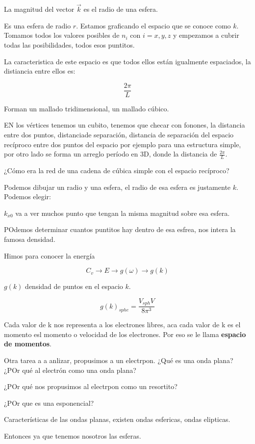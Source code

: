 \documentclass{article}
\begin{document}
La magnitud del vector $\vec{k}$ es el radio de una esfera. 


Es una esfera de radio $r$. Estamos graficando el espacio que se conoce como $k$. Tomamos todos los valores posibles de $n_{i}$ con $i=x,y,z$  y empezamos a cubrir todas las posibilidades, todos esos puntitos. 

La caracteristica de este espacio es que todos ellos están igualmente espaciados, la distiancia entre ellos es:


\[ \frac{2\pi}{L} \]


Forman un mallado tridimensional, un mallado cúbico. 

EN los vértices tenemos un cubito, tenemos que checar con fonones, la distancia entre dos puntos, distanciade separación, distancia de separación del espacio recíproco entre dos puntos del espacio por ejemplo para una estructura simple, por otro lado se forma un arreglo período en 3D, donde la distancia de $\frac{2\pi}{L}$.


¿Cómo era la red de una cadena de cúbica simple con el espacio recíproco? 

Podemos dibujar un radio y una esfera, el radio de esa esfera es justamente $k$. Podemos elegir:


$k_{x0}$ va a ver muchos punto que tengan la misma magnitud sobre esa esfera. 


POdemos determinar cuantos puntitos hay dentro de esa esfrea, nos intera la famosa densidad. 

Himos para conocer la energía

\[ C_{v} \to E \to g(\omega) \to g(k) \]

$g(k)$ densidad de puntos en el espacio $k$. 

\[ g(k)_{sphe} = \frac{ V_{sph}V }{  8\pi^{3} } \]



Cada valor de k nos representa a los electrones libres, aca cada valor de k es el momento esl momento o velocidad de los electrones. Por eso se le llama \textbf{espacio de momentos}.


Otra tarea a a anlizar, propusimos a un electrpon. ¿Qué es una onda plana? ¿POr qué al electrón como una onda plana?


¿POr qué nos propusimos al electrpon como un resortito? 


¿POr que es una esponencial? 

 Características de las ondas planas, existen ondas esfericas, ondas elipticas. 
 
 
 Entonces ya que tenemos nosotros las esferas. 
 
\end{document}

